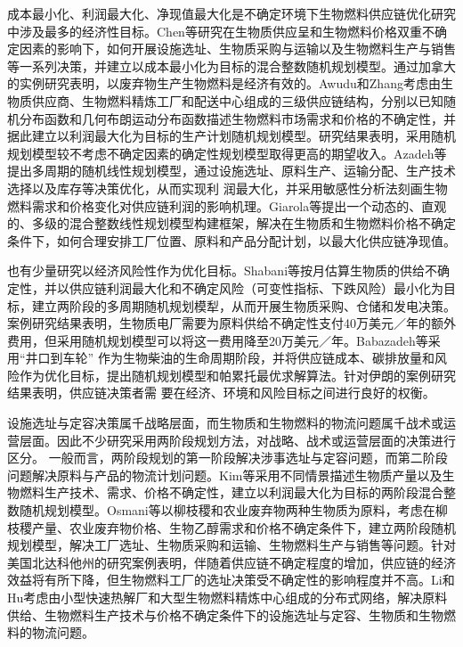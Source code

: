 成本最小化、利润最大化、净现值最大化是不确定环境下生物燃料供应链优化研究中涉及最多的经济性目标。Chen等\cite{Chen2012}研究在生物质供应呈和生物燃料价格双重不确定因素的影响下，如何开展设施选址、生物质采购与运输以及生物燃料生产与销售等一系列决策，并建立以成本最小化为目标的混合整数随机规划模型。通过加拿大的实例研究表明，以废弃物生产生物燃料是经济有效的。Awudu和Zhang\cite{Awudu2013}考虑由生物质供应商、生物燃料精炼工厂和配送中心组成的三级供应链结构，分别以已知随机分布函数和几何布朗运动分布函数描述生物燃料市场需求和价格的不确定性，并据此建立以利润最大化为目标的生产计划随机规划模型。研究结果表明，采用随机规划模型较不考虑不确定因素的确定性规划模型取得更高的期望收入。Azadeh等\cite{Azadeh2014}提出多周期的随机线性规划模型，通过设施选址、原料生产、运输分配、生产技术选择以及库存等决策优化，从而实现利 润最大化，并采用敏感性分析法刻画生物燃料需求和价格变化对供应链利润的影响机理。Giarola等\cite{Giarola2012}提出一个动态的、直观的、多级的混合整数线性规划模型构建框架，解决在生物质和生物燃料价格不确定条件下，如何合理安排工厂位置、原料和产品分配计划，以最大化供应链净现值。

也有少量研究以经济风险性作为优化目标。Shabani等\cite{Shabani2014}按月估算生物质的供给不确定性，并以供应链利润最大化和不确定风险（可变性指标、下跌风险）最小化为目标，建立两阶段的多周期随机规划模犁，从而开展生物质采购、仓储和发电决策。案例研究结果表明，生物质电厂需要为原料供给不确定性支付40万美元／年的额外费用，但采用随机规划模型可以将这一费用降至20万美元／年。Babazadeh等\cite{Babazadeh2017}采用“井口到车轮” 作为生物柴油的生命周期阶段，并将供应链成本、碳排放量和风险作为优化目标，提出随机规划模型和帕累托最优求解算法。针对伊朗的案例研究结果表明，供应链决策者需 要在经济、环境和风险目标之间进行良好的权衡。

设施选址与定容决策属千战略层面，而生物质和生物燃料的物流问题属千战术或运营层面。因此不少研究采用两阶段规划方法，对战略、战术或运营层面的决策进行区分。 一般而言，两阶段规划的第一阶段解决涉事选址与定容问题，而第二阶段问题解决原料与产品的物流计划问题。Kim等\cite{Kim2011}采用不同情景描述生物质产量以及生物燃料生产技术、需求、价格不确定性，建立以利润最大化为目标的两阶段混合整数随机规划模型。Osmani等\cite{Osmani2013}以柳枝稷和农业废弃物两种生物质为原料，考虑在柳枝稷产量、农业废弃物价格、生物乙醇需求和价格不确定条件下，建立两阶段随机规划模型，解决工厂选址、生物质采购和运输、生物燃料生产与销售等问题。针对美国北达科他州的研究案例表明，伴随着供应链不确定程度的增加，供应链的经济效益将有所下降，但生物燃料工厂的选址决策受不确定性的影响程度并不高。Li和Hu\cite{Li2014}考虑由小型快速热解厂和大型生物燃料精炼中心组成的分布式网络，解决原料供给、生物燃料生产技术与价格不确定条件下的设施选址与定容、生物质和生物燃料的物流问题。


